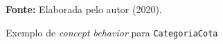 \begin{figure}[ht!]
\centering

\caption{\textmd{Exemplo de \textit{concept behavior} para \texttt{CategoriaCota}}}
\label{fig:behaviorcat}

\par\medskip\textbf{Fonte:} Elaborada pelo autor (2020). \par\medskip

\end{figure}

